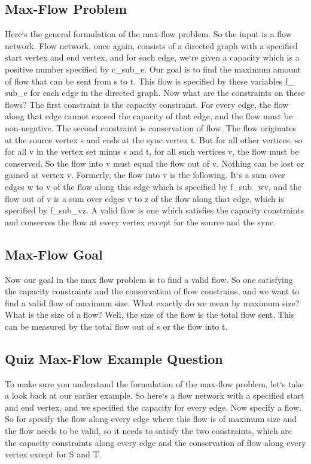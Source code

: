 \subsection{Max-Flow Problem}
Here`s the general formulation of the max-flow problem.
So the input is a flow network.
Flow network, once again, consists of a directed graph with a specified start vertex and end vertex, and for each edge, we`re given a capacity which is a positive number specified by c\_sub\_e.
Our goal is to find the maximum amount of flow that can be sent from s to t.
This flow is specified by these variables f\_ sub\_e for each edge in the directed graph.
Now what are the constraints on these flows? The first constraint is the capacity constraint.
For every edge, the flow along that edge cannot exceed the capacity of that edge, and the flow must be non-negative.
The second constraint is conservation of flow.
The flow originates at the source vertex s and ends at the sync vertex t.
But for all other vertices, so for all v in the vertex set minus s and t, for all such vertices v, the flow must be conserved.
So the flow into v must equal the flow out of v.
Nothing can be lost or gained at vertex v.
Formerly, the flow into v is the following.
It`s a sum over edges w to v of the flow along this edge which is specified by f\_sub\_wv, and the flow out of v is a sum over edges v to z of the flow along that edge, which is specified by f\_sub\_vz.
A valid flow is one which satisfies the capacity constraints and conserves the flow at every vertex except for the source and the sync.

\subsection{Max-Flow Goal}
Now our goal in the max flow problem is to find a valid flow.
So one satisfying the capacity constraints and the conservation of flow constrains, and we want to find a valid flow of maximum size.
What exactly do we mean by maximum size? What is the size of a flow? Well, the size of the flow is the total flow sent.
This can be measured by the total flow out of s or the flow into t.

\subsection{Quiz  Max-Flow Example Question}
To make sure you understand the formulation of the max-flow problem, let`s take a look back at our earlier example.
So here`s a flow network with a specified start and end vertex, and we specified the capacity for every edge.
Now specify a flow.
So for specify the flow along every edge where this flow is of maximum size and the flow needs to be valid, so it needs to satisfy the two constraints, which are the capacity constraints along every edge and the conservation of flow along every vertex except for S and T\@.

